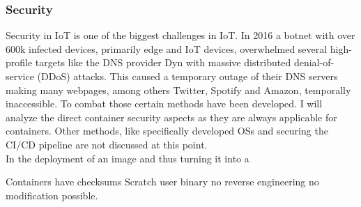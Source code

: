 \subsubsection{Security}
Security in IoT is one of the biggest challenges in IoT. In 2016 a botnet with over 600k infected devices, primarily edge and IoT devices, overwhelmed several high-profile targets like the DNS provider Dyn with massive distributed denial-of-service (DDoS) attacks. This caused a temporary outage of their DNS servers making many webpages, among others  Twitter, Spotify and Amazon, temporally inaccessible. To combat those certain methods have been developed. I will analyze the direct container security aspects as they are always applicable for containers. Other methods, like specifically developed OSs and securing the CI/CD pipeline are not discussed at this point.\\
In the deployment of an image and thus turning it into a 

Containers have checksums
Scratch user
binary no reverse engineering
no modification possible.